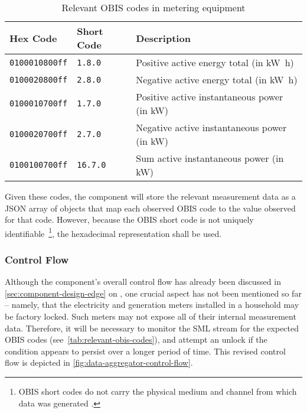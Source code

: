 \begin{table}[hbt]
	\centering
  	\begin{tabularx}{\textwidth}{|l|l|X|}
		\hline
		\textbf{Hex Code} & \textbf{Short Code} & \textbf{Description} \\
	    \hline
	    \texttt{0100010800ff} & \texttt{1.8.0} & Positive active energy total (in \si{\kilo\watt\hour}) \\
	    	\texttt{0100020800ff} & \texttt{2.8.0} & Negative active energy total (in \si{\kilo\watt\hour}) \\
	    \texttt{0100010700ff} & \texttt{1.7.0} & Positive active instantaneous power (in \si{\kilo\watt}) \\
	    \texttt{0100020700ff} & \texttt{2.7.0} & Negative active instantaneous power (in \si{\kilo\watt}) \\
	    	\texttt{0100100700ff} & \texttt{16.7.0} & Sum active instantaneous power (in \si{\kilo\watt}) \\
	    	\hline
	\end{tabularx}
  	\caption{Relevant \acs{OBIS} codes in metering equipment}
  	\label{tab:relevant-obis-codes}
\end{table}

\FloatBarrier

Given these codes, the component will store the relevant measurement data as a \acs{JSON} array of objects that map each observed \acs{OBIS} code to the value observed for that code. However, because the \acs{OBIS} short code is not uniquely identifiable~\footnote{\ac{OBIS} short codes do not carry the physical medium and channel from which data was generated \cite{promoticObis}.}, the hexadecimal representation shall be used.


\subsubsection{Control Flow}
\label{sec:data-aggregator-control-flow}

Although the component's overall control flow has already been discussed in \autoref{sec:component-design-edge} on , one crucial aspect has not been mentioned so far -- namely, that the electricity and generation meters installed in a household may be factory locked. Such meters may not expose all of their internal measurement data. Therefore, it will be necessary to monitor the \acs{SML} stream for the expected \acs{OBIS} codes (see~\autoref{tab:relevant-obis-codes}), and attempt an unlock if the condition appears to persist over a longer period of time. This revised control flow is depicted in \autoref{fig:data-aggregator-control-flow}.

